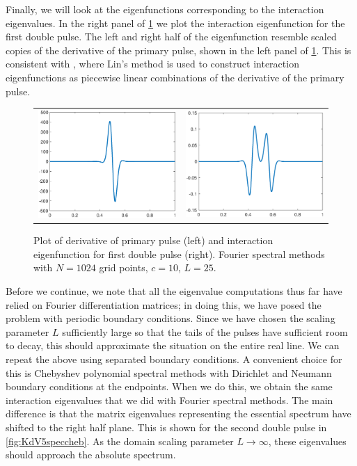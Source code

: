 \documentclass[thesis.tex]{subfiles}
\begin{document}
Finally, we will look at the eigenfunctions corresponding to the interaction eigenvalues. In the right panel of \cref{fig:KdV5inteigplot} we plot the interaction eigenfunction for the first double pulse. The left and right half of the eigenfunction resemble scaled copies of the derivative of the primary pulse, shown in the left panel of \cref{fig:KdV5inteigplot}. This is consistent with \cite{Sandstede1998}, where Lin's method is used to construct interaction eigenfunctions as piecewise linear combinations of the derivative of the primary pulse.

\begin{figure}
\begin{center}
\begin{tabular}{cc}
\includegraphics[width=6cm]{images/kdv5numerics/single10derivative} &
\includegraphics[width=6cm]{images/kdv5numerics/double1inteigfunction} \\
\end{tabular}
\caption{Plot of derivative of primary pulse (left) and interaction eigenfunction for first double pulse (right). Fourier spectral methods with $N = 1024$ grid points, $c = 10$, $L = 25$.}
\label{fig:KdV5inteigplot}
\end{center}
\end{figure}

Before we continue, we note that all the eigenvalue computations thus far have relied on Fourier differentiation matrices; in doing this, we have posed the problem with periodic boundary conditions. Since we have chosen the scaling parameter $L$ sufficiently large so that the tails of the pulses have sufficient room to decay, this should approximate the situation on the entire real line. We can repeat the above using separated boundary conditions. A convenient choice for this is Chebyshev polynomial spectral methods with Dirichlet and Neumann boundary conditions at the endpoints. When we do this, we obtain the same interaction eigenvalues that we did with Fourier spectral methods. The main difference is that the matrix eigenvalues representing the essential spectrum have shifted to the right half plane. This is shown for the second double pulse in \cref{fig:KdV5speccheb}. As the domain scaling parameter $L \rightarrow \infty$, these eigenvalues should approach the absolute spectrum.
\end{document}
